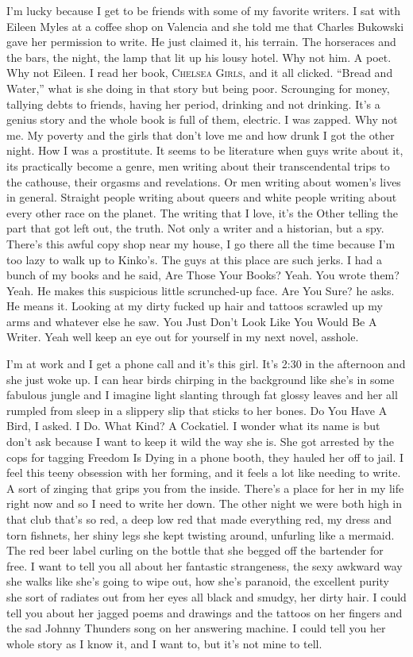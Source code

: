 \documentclass[
]{memoir}
\begin{document}
I'm lucky because I get to be friends with some of my favorite writers.
I sat with Eileen Myles at a coffee shop on Valencia and she told me
that Charles Bukowski gave her permission to write. He just claimed it,
his terrain. The horseraces and the bars, the night, the lamp that lit
up his lousy hotel. Why not him. A poet. Why not Eileen. I read her
book, \textsc{Chelsea Girls}, and it all clicked. ``Bread and Water,''
what is she doing in that story but being poor. Scrounging for money,
tallying debts to friends, having her period, drinking and not drinking.
It's a genius story and the whole book is full of them, electric. I was
zapped. Why not me. My poverty and the girls that don't love me and how
drunk I got the other night. How I was a prostitute. It seems to be
literature when guys write about it, its practically become a genre, men
writing about their transcendental trips to the cathouse, their orgasms
and revelations. Or men writing about women's lives in general. Straight
people writing about queers and white people writing about every other
race on the planet. The writing that I love, it's the Other telling the
part that got left out, the truth. Not only a writer and a historian,
but a spy. There's this awful copy shop near my house, I go there all
the time because I'm too lazy to walk up to Kinko's. The guys at this
place are such jerks. I had a bunch of my books and he said, Are Those
Your Books? Yeah. You wrote them? Yeah. He makes this suspicious little
scrunched-up face. Are You Sure? he asks. He means it. Looking at my
dirty fucked up hair and tattoos scrawled up my arms and whatever else
he saw. You Just Don't Look Like You Would Be A Writer. Yeah well keep
an eye out for yourself in my next novel, asshole.

I'm at work and I get a phone call and it's this girl. It's 2:30 in the
afternoon and she just woke up. I can hear birds chirping in the
background like she's in some fabulous jungle and I imagine light
slanting through fat glossy leaves and her all rumpled from sleep in a
slippery slip that sticks to her bones. Do You Have A Bird, I asked. I
Do. What Kind? A Cockatiel. I wonder what its name is but don't ask
because I want to keep it wild the way she is. She got arrested by the
cops for tagging Freedom Is Dying in a phone booth, they hauled her off
to jail. I feel this teeny obsession with her forming, and it feels a
lot like needing to write. A sort of zinging that grips you from the
inside. There's a place for her in my life right now and so I need to
write her down. The other night we were both high in that club that's so
red, a deep low red that made everything red, my dress and torn
fishnets, her shiny legs she kept twisting around, unfurling like a
mermaid. The red beer label curling on the bottle that she begged off
the bartender for free. I want to tell you all about her fantastic
strangeness, the sexy awkward way she walks like she's going to wipe
out, how she's paranoid, the excellent purity she sort of radiates out
from her eyes all black and smudgy, her dirty hair. I could tell you
about her jagged poems and drawings and the tattoos on her fingers and
the sad Johnny Thunders song on her answering machine. I could tell you
her whole story as I know it, and I want to, but it's not mine to tell.
\end{document}

